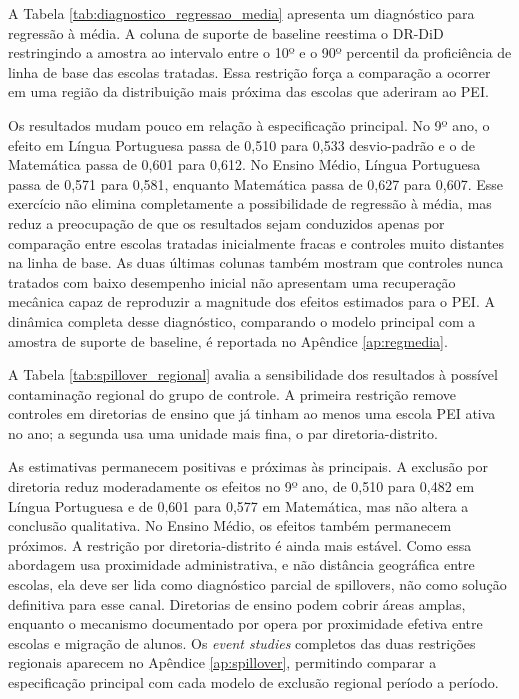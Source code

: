 A Tabela \ref{tab:diagnostico_regressao_media} apresenta um diagnóstico para regressão à média. A coluna de suporte de baseline reestima o DR-DiD restringindo a amostra ao intervalo entre o 10º e o 90º percentil da proficiência de linha de base das escolas tratadas. Essa restrição força a comparação a ocorrer em uma região da distribuição mais próxima das escolas que aderiram ao PEI.



Os resultados mudam pouco em relação à especificação principal. No 9º ano, o efeito em Língua Portuguesa passa de 0,510 para 0,533 desvio-padrão e o de Matemática passa de 0,601 para 0,612. No Ensino Médio, Língua Portuguesa passa de 0,571 para 0,581, enquanto Matemática passa de 0,627 para 0,607. Esse exercício não elimina completamente a possibilidade de regressão à média, mas reduz a preocupação de que os resultados sejam conduzidos apenas por comparação entre escolas tratadas inicialmente fracas e controles muito distantes na linha de base. As duas últimas colunas também mostram que controles nunca tratados com baixo desempenho inicial não apresentam uma recuperação mecânica capaz de reproduzir a magnitude dos efeitos estimados para o PEI. A dinâmica completa desse diagnóstico, comparando o modelo principal com a amostra de suporte de baseline, é reportada no Apêndice \ref{ap:regmedia}.

A Tabela \ref{tab:spillover_regional} avalia a sensibilidade dos resultados à possível contaminação regional do grupo de controle. A primeira restrição remove controles em diretorias de ensino que já tinham ao menos uma escola PEI ativa no ano; a segunda usa uma unidade mais fina, o par diretoria-distrito.



As estimativas permanecem positivas e próximas às principais. A exclusão por diretoria reduz moderadamente os efeitos no 9º ano, de 0,510 para 0,482 em Língua Portuguesa e de 0,601 para 0,577 em Matemática, mas não altera a conclusão qualitativa. No Ensino Médio, os efeitos também permanecem próximos. A restrição por diretoria-distrito é ainda mais estável. Como essa abordagem usa proximidade administrativa, e não distância geográfica entre escolas, ela deve ser lida como diagnóstico parcial de spillovers, não como solução definitiva para esse canal. Diretorias de ensino podem cobrir áreas amplas, enquanto o mecanismo documentado por \textcite{santos2022_spillover_pei_escolas_regulares} opera por proximidade efetiva entre escolas e migração de alunos. Os \textit{event studies} completos das duas restrições regionais aparecem no Apêndice \ref{ap:spillover}, permitindo comparar a especificação principal com cada modelo de exclusão regional período a período.

